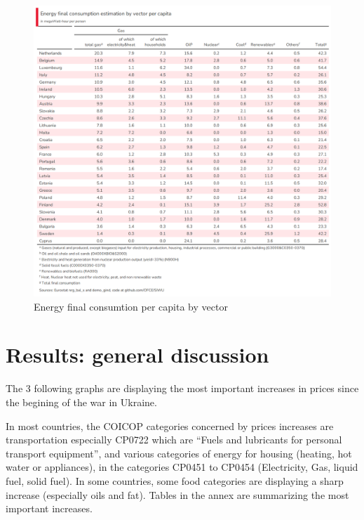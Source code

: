 \documentclass[
  9pt,
  a4paper,
  DIV=11,
  numbers=noendperiod,
  oneside]{scrartcl}
\begin{document}
\begin{figure}

\caption{Energy final consumtion per capita by vector}

{\centering \includegraphics[width=16cm,height=\textheight]{../svg/tab1.png}

}

\end{figure}

\hypertarget{results-general-discussion}{%
\section{Results: general discussion}\label{results-general-discussion}}

The 3 following graphs are displaying the most important increases in
prices since the begining of the war in Ukraine.

In most countries, the COICOP categories concerned by prices increases
are transportation especially CP0722 which are ``Fuels and lubricants
for personal transport equipment'', and various categories of energy for
housing (heating, hot water or appliances), in the categories CP0451 to
CP0454 (Electricity, Gas, liquid fuel, solid fuel). In some countries,
some food categories are displaying a sharp increase (especially oils
and fat). Tables in the annex are summarizing the most important
increases.
\end{document}
